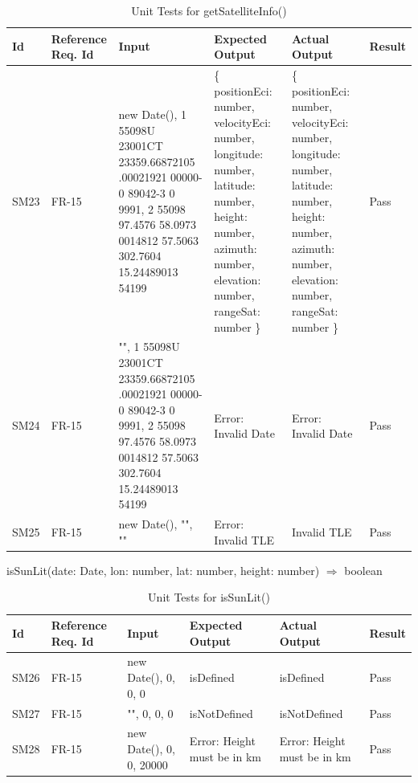 \documentclass[12pt, titlepage]{article}
\begin{document}
\begin{center}
\begin{longtable}{|p{1cm} | p{2cm} |p{2cm}| p{2cm} |p{2cm}| p{2cm}|}
\caption{Unit Tests for \newline getSatelliteInfo()}
\hline
\textbf{Id} & \textbf{Reference Req. Id} & \textbf{Input} & \textbf{Expected Output} & \textbf{Actual Output} & \textbf{Result} \\
\hline
SM23 & FR-15 & { new Date(), 1 55098U 23001CT  23359.66872105  .00021921  00000-0  89042-3 0  9991, 2 55098  97.4576  58.0973 0014812  57.5063 302.7604 15.24489013 54199 } & \{
    positionEci: number,
    velocityEci: number,
    longitude: number,
    latitude: number,
    height: number,
    azimuth: number,
    elevation: number,
    rangeSat: number
  \}
 & \{
    positionEci: number,
    velocityEci: number,
    longitude: number,
    latitude: number,
    height: number,
    azimuth: number,
    elevation: number,
    rangeSat: number
  \} & Pass
\\
\hline
SM24 & FR-15 & { "", 1 55098U 23001CT  23359.66872105  .00021921  00000-0  89042-3 0  9991, 2 55098  97.4576  58.0973 0014812  57.5063 302.7604 15.24489013 54199 } & Error: Invalid Date
 & Error: Invalid Date & Pass
 \\
\hline
SM25 & FR-15 & { new Date(), "", "" } & Error: Invalid TLE
 & Invalid TLE & Pass
 \\
 \hline
\end{longtable}

\end{center}

isSunLit(date: Date, lon: number,
  lat: number,
  height: number) $\Rightarrow$ boolean

\begin{center}
\begin{longtable}{|p{1cm} | p{2cm} |p{2cm}| p{2cm} |p{2cm}| p{2cm}|}
\caption{Unit Tests for isSunLit()}
\hline
\textbf{Id} & \textbf{Reference Req. Id} & \textbf{Input} & \textbf{Expected Output} & \textbf{Actual Output} & \textbf{Result} \\
\hline
SM26 & FR-15 & { new Date(), 0, 0, 0 } & isDefined
 & isDefined & Pass
\\
\hline
SM27 & FR-15 & { "", 0, 0, 0 } & isNotDefined
 & isNotDefined & Pass
 \\
\hline
SM28 & FR-15 & { new Date(), 0, 0, 20000} & Error: Height must be in km
 & Error: Height must be in km & Pass
 \\
 \hline
\end{longtable}

\end{center}
\end{document}
